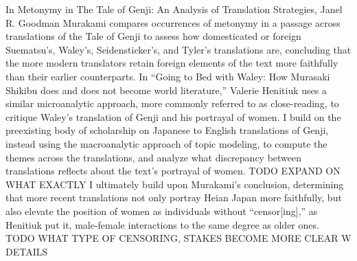 \documentclass[12pt]{article}
\begin{document}
\begin{flushleft}
\begin{spacing}{2.0}
In Metonymy in The Tale of Genji: An Analysis of Translation Strategies, Janel R. Goodman Murakami compares occurrences of metonymy in a passage across translations of the Tale of Genji to assess how domesticated or foreign Suematsu's, Waley's, Seidensticker's, and Tyler's translations are, concluding that the more modern translators retain foreign elements of the text more faithfully than their earlier counterparts. In ``Going to Bed with Waley: How Murasaki Shikibu does and does not become world literature,'' Valerie Henitiuk uses a similar microanalytic approach, more commonly referred to as close-reading, to critique Waley's translation of Genji and his portrayal of women. I build on the preexisting body of scholarship on Japanese to English translations of Genji, instead using the macroanalytic approach of topic modeling, to compute the themes across the translations, and analyze what discrepancy between translations reflects about the text's portrayal of women. TODO EXPAND ON WHAT EXACTLY I ultimately build upon Murakami's conclusion, determining that more recent translations not only portray Heian Japan more faithfully, but also elevate the position of women as individuals without ``censor[ing],'' as Henitiuk put it, male-female interactions to the same degree as older ones. TODO WHAT TYPE OF CENSORING, STAKES BECOME MORE CLEAR W DETAILS


\end{spacing}
\end{flushleft}
\end{document}
